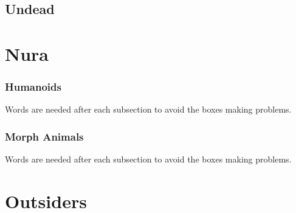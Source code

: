 \documentclass[a4paper,openany]{book}
\begin{document}
\section{Undead}

\begin{multicols}{2}

\ghoul

\ghast

\demilich

\lich

\end{multicols}

\chapter{Nura}

\begin{multicols}{2}

\subsection{Humanoids}
Words are needed after each subsection to avoid the boxes making problems.




\goblin

\goblin

\goblincaster

\hobgoblin

\ogre

\subsection{Morph Animals}
Words are needed after each subsection to avoid the boxes making problems.



\morphrat

\morphhorse

\morphcat

\morphslug

\morphspider

\morphwolf

\morphhuman

\end{multicols}

\chapter{Outsiders}
\end{document}
